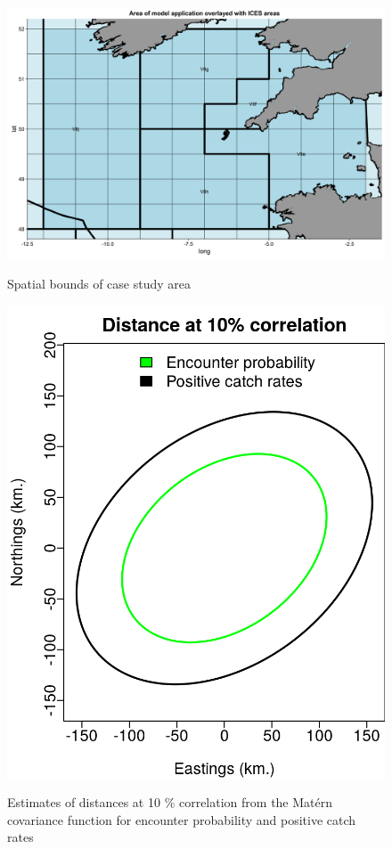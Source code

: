 \documentclass{article}
\begin{document}
\begin{figure}[!ht]
\begin{center}
	\includegraphics[width = 0.9\linewidth]{"figures/AreaMap"}
	\label{fig:S9}
	\caption{Spatial bounds of case study area}
	\end{center}
\end{figure}

\begin{figure}[!ht]
\begin{center}
	\includegraphics[width = 0.9\linewidth]{"figures/Aniso"}
	\label{fig:S10}
	\caption{Estimates of distances at 10 \% correlation from the Matérn
		covariance function for encounter probability and positive
		catch rates}
	\end{center}
\end{figure}
\end{document}
